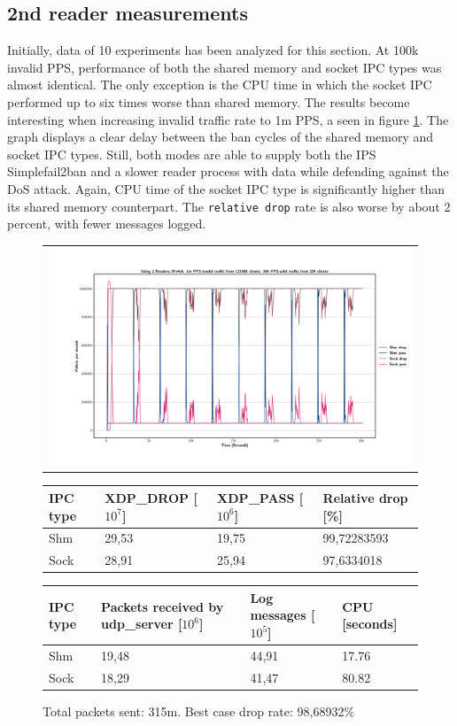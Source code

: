 \subsection{2nd reader measurements}
Initially, data of 10 experiments has been analyzed for this section.
At 100k invalid PPS, performance of both the shared memory and socket IPC types was almost identical.
The only exception is the CPU time in which the socket IPC performed up to six times worse than shared memory.
The results become interesting when increasing invalid traffic rate to 1m PPS, a seen in figure \ref{fig:data:ipv4v6:1m:131068:2nd}.
The graph displays a clear delay between the ban cycles of the shared memory and socket IPC types.
Still, both modes are able to supply both the IPS Simplefail2ban and a slower reader process with data while defending against the DoS attack.
Again, CPU time of the socket IPC type is significantly higher than its shared memory counterpart.
The \texttt{relative drop} rate is also worse by about 2 percent, with fewer messages logged.

\begin{figure}[!h]
	\centering
	\scriptsize
	\begin{tabular}{c}
    	\centerline{\includegraphics[width=1.2\textwidth]{images/IPv4v6_1m_2ndReader_1.png}}
	\end{tabular}
	\begin{tabular}{llll}
		\toprule
		\textbf{IPC type} & \textbf{XDP\_DROP [$10^7$]} & \textbf{XDP\_PASS [$10^6$]} & \textbf{Relative drop [\%]} \\ \midrule 
		Shm & 29,53 & 19,75 & 99,72283593 \\
        Sock & 28,91 & 25,94 & 97,6334018 \\
	\bottomrule
	\end{tabular}
    \begin{tabular}{llll}
		\toprule
		\textbf{IPC type} & \textbf{Packets received by udp\_server [$10^6$]} & \textbf{Log messages [$10^5$]} & \textbf{CPU [seconds]} \\ \midrule 
		Shm & 19,48 & 44,91 & 17.76 \\
        Sock & 18,29 & 41,47 & 80.82 \\
	\bottomrule
	\end{tabular}
	\caption[Simplefail2ban with 2nd Reader, IPv4v6, 1m \ac{PPS}, 131068 malicious clients]{Total packets sent: 315m. Best case drop rate: 98,68932\%}
	\label{fig:data:ipv4v6:1m:131068:2nd}
\end{figure}

